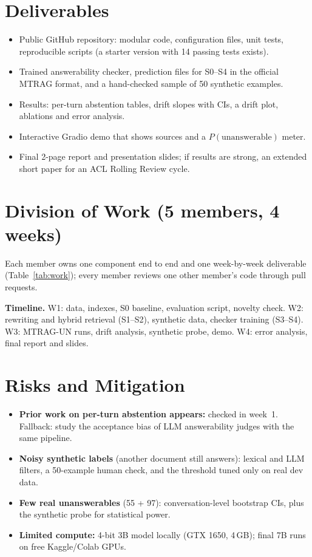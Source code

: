 \documentclass[10pt,twocolumn]{article}
\begin{document}
\section{Deliverables}
\begin{itemize}
\item Public GitHub repository: modular code, configuration files, unit tests, reproducible scripts (a starter version with 14 passing tests exists).
\item Trained answerability checker, prediction files for S0--S4 in the official MTRAG format, and a hand-checked sample of 50 synthetic examples.
\item Results: per-turn abstention tables, drift slopes with CIs, a drift plot, ablations and error analysis.
\item Interactive Gradio demo that shows sources and a $P(\text{unanswerable})$ meter.
\item Final 2-page report and presentation slides; if results are strong, an extended short paper for an ACL Rolling Review cycle.
\end{itemize}

\section{Division of Work (5 members, 4 weeks)}
Each member owns one component end to end and one week-by-week deliverable (Table~\ref{tab:work}); every member reviews one other member's code through pull requests.

\textbf{Timeline.} W1: data, indexes, S0 baseline, evaluation script, novelty check. W2: rewriting and hybrid retrieval (S1--S2), synthetic data, checker training (S3--S4). W3: MTRAG-UN runs, drift analysis, synthetic probe, demo. W4: error analysis, final report and slides.

\section{Risks and Mitigation}
\begin{itemize}
\item \textbf{Prior work on per-turn abstention appears:} checked in week~1. Fallback: study the acceptance bias of LLM answerability judges \cite{ails} with the same pipeline.
\item \textbf{Noisy synthetic labels} (another document still answers): lexical and LLM filters, a 50-example human check, and the threshold tuned only on real dev data.
\item \textbf{Few real unanswerables} (55 + 97): conversation-level bootstrap CIs, plus the synthetic probe for statistical power.
\item \textbf{Limited compute:} 4-bit 3B model locally (GTX 1650, 4\,GB); final 7B runs on free Kaggle/Colab GPUs.
\end{itemize}
\end{document}
